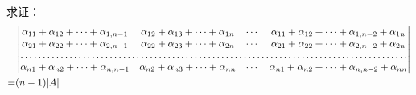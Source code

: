 \documentclass[twoside,openright]{book}
\begin{document}
\begin{CJK*}{UTF8}{}
\begin{quest}
\label{quest:102}
求证：
\[
\begin{split}
&
\begin{vmatrix}
\alpha_{11}+\alpha_{12}+\dotsb+\alpha_{1,n-1} &
\alpha_{12}+\alpha_{13}+\dotsb+\alpha_{1n}    &
\cdots &
\alpha_{11}+\alpha_{12}+\dotsb+\alpha_{1,n-2}+\alpha_{1n} \\
\alpha_{21}+\alpha_{22}+\dotsb+\alpha_{2,n-1} &
\alpha_{22}+\alpha_{23}+\dotsb+\alpha_{2n}    &
\cdots &
\alpha_{21}+\alpha_{22}+\dotsb+\alpha_{2,n-2}+\alpha_{2n} \\
\hdotsfor{4} \\
\alpha_{n1}+\alpha_{n2}+\dotsb+\alpha_{n,n-1} &
\alpha_{n2}+\alpha_{n3}+\dotsb+\alpha_{nn}    &
\cdots &
\alpha_{n1}+\alpha_{n2}+\dotsb+\alpha_{n,n-2}+\alpha_{nn}
\end{vmatrix}\\
=&(n-1)\abs{A}
\end{split}
\]
\end{quest}


\end{CJK*}
\end{document}

